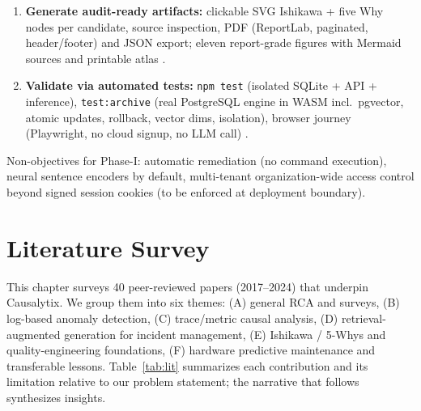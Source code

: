 \documentclass[12pt,a4paper,oneside]{report}
\begin{document}
\begin{enumerate}[label=O\arabic*.,leftmargin=1.8em]
\item \textbf{Generate audit-ready artifacts:} clickable SVG Ishikawa + five Why nodes per candidate, source inspection, PDF (ReportLab, paginated, header/footer) and JSON export; eleven report-grade figures with Mermaid sources and printable atlas \cite{ciecinska2023identification,lee2022survey}.

\item \textbf{Validate via automated tests:} \texttt{npm test} (isolated SQLite + API + inference), \texttt{test:archive} (real PostgreSQL engine in WASM incl.\ pgvector, atomic updates, rollback, vector dims, isolation), browser journey (Playwright, no cloud signup, no LLM call) \cite{amershi2019software}.
\end{enumerate}

Non-objectives for Phase-I: automatic remediation (no command execution), neural sentence encoders by default, multi-tenant organization-wide access control beyond signed session cookies (to be enforced at deployment boundary).

\chapter{Literature Survey}
\label{ch:lit}

This chapter surveys 40 peer-reviewed papers (2017--2024) that underpin Causalytix. We group them into six themes: (A) general RCA and surveys, (B) log-based anomaly detection, (C) trace/metric causal analysis, (D) retrieval-augmented generation for incident management, (E) Ishikawa / 5-Whys and quality-engineering foundations, (F) hardware predictive maintenance and transferable lessons. Table~\ref{tab:lit} summarizes each contribution and its limitation relative to our problem statement; the narrative that follows synthesizes insights.
\end{document}
